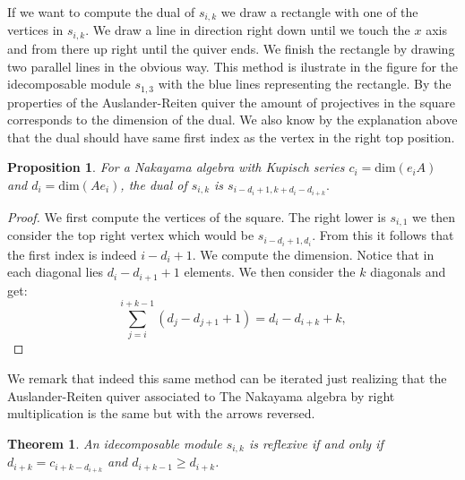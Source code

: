 \documentclass[12pt, a4paper]{article}
\numberwithin{equation}{section}
\theoremstyle{definition}
\theoremstyle{plain}
\newtheorem{proposition}[definition]{Proposition}
\newtheorem{theorem}[definition]{Theorem}
\theoremstyle{remark}
\begin{document}
If we want to compute the dual of $s_{i,k}$ we draw a rectangle
 with one of the vertices in $s_{i,k}.$ We draw a line in direction right 
 down until we touch the $x$ axis and from there up right until 
 the quiver ends. We finish the rectangle by drawing two parallel
  lines in the obvious way. This method is ilustrate in the figure for the idecomposable module $s_{1,3}$ with the blue lines representing the rectangle. 
  By the properties of the Auslander-Reiten quiver the amount of projectives in the square corresponds to the dimension of the dual. We also know by the explanation above that the dual should have same first index as the vertex in the right top position.
\begin{proposition}
    For a Nakayama algebra with Kupisch series $c_i=\text{dim}(e_iA)$ and $d_i=\text{dim}(Ae_i)$, the dual of $s_{i,k}$ is 
	$s_{i-d_i+1,k+d_i-d_{i+k}}.$
\end{proposition}
\begin{proof}
    We first compute the vertices of the square. The right lower is $s_{i,1}$ we then consider the top right vertex which would be $s_{i-d_{i}+1,d_{i}}.$ From this it follows that the first index is indeed $i-d_i+1.$ We compute the dimension. Notice that in each diagonal lies $d_{i}-d_{i+1}+1$ elements. We then consider the $k$ diagonals and get:
   \begin{equation}
\label{eq:reachable}
\sum_{j=i}^{i+k-1} (d_j - d_{j+1} + 1) = d_i - d_{i+k} + k,
\end{equation}
\end{proof}
We remark that indeed this same method can be iterated just realizing that the Auslander-Reiten quiver associated to The Nakayama algebra by right multiplication is the same but with the arrows reversed. 
\begin{theorem}
	An idecomposable module $s_{i,k}$ is reflexive if and only if $d_{i+k}=c_{i+k-d_{i+k}}$ and $d_{i+k-1}\geq d_{i+k}$.
\end{theorem}
\end{document}
